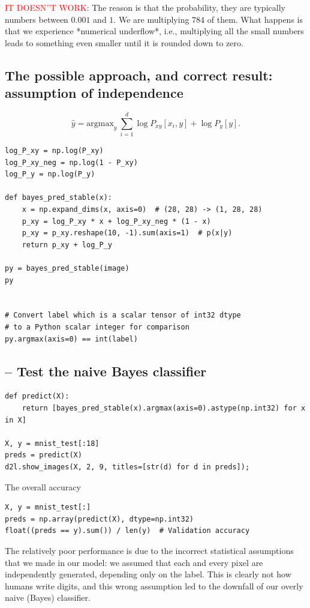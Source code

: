 \textcolor{red}{IT DOESN''T WORK}: The reason is that the probability, they are
typically numbers between $0.001$ and $1$. We are multiplying $784$ of them.
What happens is that we experience *numerical underflow*, i.e., multiplying all
the small numbers leads to something even smaller until it is rounded down to
zero.

\subsection{The possible approach, and correct result: assumption of independence}


\begin{equation}
 \hat{y} = \mathrm{argmax}_y \> \sum_{i=1}^d \log P_{xy}[x_i, y] + \log P_y[y].
\end{equation}

\begin{lstlisting}
log_P_xy = np.log(P_xy)
log_P_xy_neg = np.log(1 - P_xy)
log_P_y = np.log(P_y)

def bayes_pred_stable(x):
    x = np.expand_dims(x, axis=0)  # (28, 28) -> (1, 28, 28)
    p_xy = log_P_xy * x + log_P_xy_neg * (1 - x)
    p_xy = p_xy.reshape(10, -1).sum(axis=1)  # p(x|y)
    return p_xy + log_P_y

py = bayes_pred_stable(image)
py


# Convert label which is a scalar tensor of int32 dtype
# to a Python scalar integer for comparison
py.argmax(axis=0) == int(label)
\end{lstlisting}
 
\subsection{-- Test the naive Bayes classifier}

\begin{lstlisting}
def predict(X):
    return [bayes_pred_stable(x).argmax(axis=0).astype(np.int32) for x in X]

X, y = mnist_test[:18]
preds = predict(X)
d2l.show_images(X, 2, 9, titles=[str(d) for d in preds]);
\end{lstlisting}

The overall accuracy
\begin{lstlisting}
X, y = mnist_test[:]
preds = np.array(predict(X), dtype=np.int32)
float((preds == y).sum()) / len(y)  # Validation accuracy
\end{lstlisting}


The relatively poor performance is due to the incorrect statistical assumptions
that we made in our model: we assumed that each and every pixel are
independently generated, depending only on the label. This is clearly not how
humans write digits, and this wrong assumption led to the downfall of our overly
naive (Bayes) classifier.

